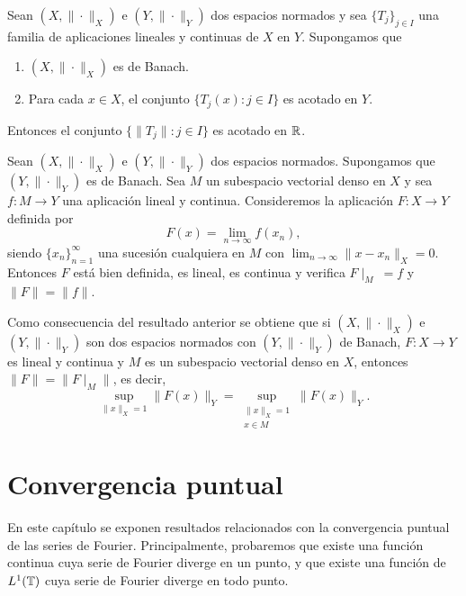 \documentclass[a4paper, 12pt]{book}
\begin{document}
\begin{theorem}\label{1.3.1}
    Sean $(X, \|\cdot\|_X)$ e $(Y,\|\cdot\|_Y)$ dos espacios normados y sea $\{T_j\}_{j \in I}$ una familia de aplicaciones lineales y continuas de $X$ en $Y$. Supongamos que
    \begin{enumerate}
        \item $(X,\|\cdot\|_X)$ es de Banach.
        \item Para cada $x \in X$, el conjunto $\{T_j(x) \colon j \in I\}$ es acotado en $Y$.
    \end{enumerate}
    Entonces el conjunto $\{\|T_j\| \colon j \in I\}$ es acotado en $\mathbb R$.
\end{theorem}

\begin{theorem}\label{1.3.2}
    Sean $(X,\|\cdot\|_X)$ e $(Y,\|\cdot\|_Y)$ dos espacios normados. Supongamos que $(Y,\|\cdot\|_Y)$ es de Banach. Sea $M$ un subespacio vectorial denso en $X$ y sea $f \colon M \to Y$ una aplicación lineal y continua. Consideremos la aplicación $F \colon X \to Y$ definida por 
    \[F(x) = \lim_{n\to\infty} f(x_n),\]
    siendo $\{x_n\}_{n=1}^\infty$ una sucesión cualquiera en $M$ con $\lim_{n\to\infty} \|x-x_n\|_X = 0$. Entonces $F$ está bien definida, es lineal, es continua y verifica $F\! \mid_M \ = f$ y $\|F\| = \|f\|$.
\end{theorem}

Como consecuencia del resultado anterior se obtiene que si $(X,\|\cdot\|_X)$ e $(Y,\|\cdot\|_Y)$ son dos espacios normados con $(Y,\|\cdot\|_Y)$ de Banach, $F \colon X \to Y$ es lineal y continua y $M$ es un subespacio vectorial denso en $X$, entonces $\|F\| = \|F\! \mid_M \!\! \|$, es decir,
\begin{equation}\label{1.3.3}
    \sup_{\|x\|_X = 1} \|F(x)\|_Y = \sup_{\substack{\|x\|_X = 1 \\ x \in M}} \|F(x)\|_Y.
\end{equation}

\chapter{Convergencia puntual}

En este capítulo se exponen resultados relacionados con la convergencia puntual de las series de Fourier. Principalmente, probaremos que existe una función continua cuya serie de Fourier diverge en un punto, y que existe una función de $L^1(\mathbb T)$ cuya serie de Fourier diverge en todo punto.
\end{document}
